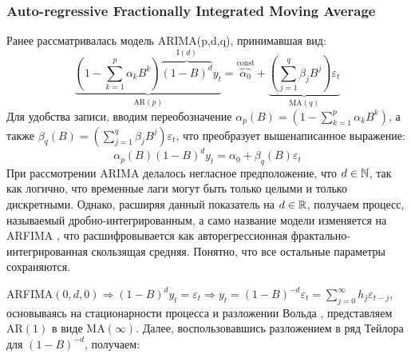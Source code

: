 \subsubsection{Auto-regressive Fractionally Integrated Moving Average}
Ранее рассматривалась модель ARIMA(p,d,q), принимавшая вид:
\begin{equation}
	\underbrace{\left(1 - \sum_{k = 1}^{p} \alpha_k B^k\right) \overbrace{(1 - B)^d}^{\text{I}(d)} y_t}_{\text{AR}(p)} = \overbrace{\alpha_0}^{\text{const}} + \underbrace{\left(\sum_{j = 1}^{q} \beta_j B^j\right) \varepsilon_{t}}_{\text{MA}(q)}
\end{equation}
Для удобства записи, вводим переобозначение $\alpha_p(B) = \left(1 - \sum_{k = 1}^{p} \alpha_k B^k\right)$, а также $\beta_{q}(B) = \left(\sum_{j = 1}^{q} \beta_j B^j\right) \varepsilon_{t}$, что преобразует вышенаписанное выражение:
\begin{equation}
	\alpha_p(B) (1 - B)^d y_t = \alpha_0 + \beta_{q}(B) \varepsilon_{t}
\end{equation}
При рассмотрении ARIMA делалось негласное предположение, что $d \in \mathbb{N}$, так как логично, что временные лаги могут быть только целыми и только дискретными. Однако, расширяя данный показатель \cite{fractal_market} на $d \in \mathbb{R}$, получаем процесс, называемый дробно-интегрированным, а само название модели изменяется на ARFIMA \cite{granger1980introduction}, что расшифровывается как авторегрессионная фрактально-интегрированная скользящая средняя. Понятно, что все остальные параметры сохраняются.

ARFIMA$(0, d, 0) \Rightarrow (1 - B)^{d}y_t = \varepsilon_{t} \Rightarrow y_t = (1 - B)^{-d}\varepsilon_t = \sum_{j = 0}^{\infty} h_j\varepsilon_{t - j}$, основываясь на стационарности процесса и разложении Вольда \cite{wold_decomposition}, представляем AR$(1)$ в виде MA$(\infty)$. Далее, воспользовавшись разложением в ряд Тейлора для $(1 - B)^{-d}$, получаем:

